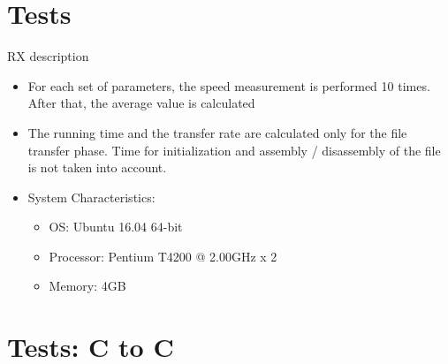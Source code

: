 \documentclass[10pt]{beamer}
\begin{document}
\section{Tests}


\begin{frame}[fragile]{RX description}
  \begin{itemize}
  	\footnotesize 	
    \item{} For each set of parameters, the speed measurement is performed 10 times. After that, the average value is calculated
    \item{} The running time and the transfer rate are calculated only for the file transfer phase. Time for initialization and assembly / disassembly of the file is not taken into account.
    \item{} System Characteristics: 
	  \begin{itemize}
	    \item{} OS: Ubuntu 16.04 64-bit
	    \item{} Processor: Pentium T4200 @ 2.00GHz x 2 
	    \item{} Memory: 4GB 
	  \end{itemize}
  \end{itemize}
\end{frame}


\section{Tests: C to C}
\end{document}
